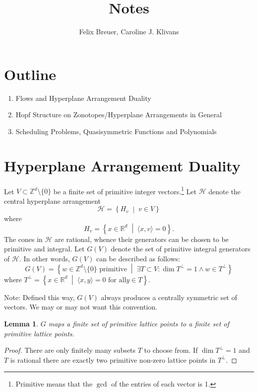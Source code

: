 \documentclass[11pt,letter]{amsart}
\title{Notes}
\author{Felix Breuer, Caroline J. Klivans}
\newtheorem{lemma}[definition]{Lemma}
\newcommand{\RR}{\mathbb{R}}
\newcommand{\ZZ}{\mathbb{Z}}
\newcommand{\HHH}{\mathcal{H}}
\newcommand{\sprod}[2]{\langle #1, #2 \rangle}
\renewcommand{\dim}{\mathsf{dim}\ }
\renewcommand{\dim}{\operatorname{dim}}
\newcommand{\mset}[2]{ \left\{ #1 \; \middle| \; #2 \right\}}
\begin{document}
\maketitle


\section{Outline}

\begin{enumerate}
\item Flows and Hyperplane Arrangement Duality
\item Hopf Structure on Zonotopes/Hyperplane Arrangements in General
\item Scheduling Problems, Quasisymmetric Functions and Polynomials
\end{enumerate}


\section{Hyperplane Arrangement Duality}

Let $V\subset \ZZ^d\setminus\{0\}$ be a finite set of primitive integer vectors.\footnote{Primitive means that the $\gcd$ of the entries of each vector is 1.} Let $\HHH$ denote the central hyperplane arrangement
\[
\HHH = \mset{H_v}{v\in V}
\]
where
\[
H_v = \mset{x\in \RR^d}{\sprod{x}{v}=0}.
\]
The cones in $\HHH$ are rational, whence their generators can be chosen to be primitive and integral. Let $G(V)$ denote the set of primitive integral generators of $\HHH$. In other words, $G(V)$ can be described as follows:
\[
 G(V) = \mset{w\in\ZZ^d\setminus\{0\}\text{ primitive}}{\exists T\subset V: \dim T^\perp = 1 \wedge w\in T^\perp}
\]
where $T^\perp = \mset{x\in\RR^d}{\sprod{x}{y}=0 \text{ for all} y\in T}$.

Note: Defined this way, $G(V)$ always produces a centrally symmetric set of vectors. We may or may not want this convention.

\begin{lemma}
$G$ maps a finite set of primitive lattice points to a finite set of primitive lattice points.
\end{lemma}

\begin{proof}
There are only finitely many subsets $T$ to choose from. If $\dim T^\perp = 1$ and $T$ is rational there are exactly two primitive non-zero lattice points in  $T^\perp$.
\end{proof}
\end{document}
